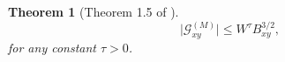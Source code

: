 \documentclass{article}
\newcommand{\1}{\mathds{1}}
\numberwithin{equation}{section}
\newcommand{\al}{\alpha}
\newcommand{\be}{\begin{equation}}
\newcommand{\ee}{\end{equation}}
\newcommand{\e}{{\varepsilon}}
\renewcommand{\cal}{\mathcal}
\renewcommand{\leq}{\leqslant}
\renewcommand{\geq}{\geqslant}
\renewcommand{\le}{\leq}
\renewcommand{\ge}{\geq}
\newcommand{\E}{\mathbb{E}}
\newcommand{\N}{\mathbb{N}}
\newcommand{\self}{\text{self-energy}}
\DeclareMathOperator{\OO}{O}
\theoremstyle{plain} %
\newtheorem{theorem}{Theorem}[section]
\theoremstyle{remark}
\newcommand{\wtSdelta}{\Sigma}
\newcommand{\Sele}{{\mathcal E}}
\begin{document}
\begin{theorem}[Theorem 1.5 of \cite{PartI_high}]
	\be\label{bound_calG}
	\big|\cal G_{xy}^{(M)}\big|\le W^\tau B_{xy}^{3/2} , %
	\ee
	for any constant $\tau>0$. 
\end{theorem}
 
\end{document}
